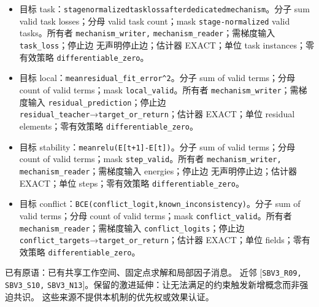 \documentclass[
  10pt,
]{article}
\begin{document}
\begin{itemize}
\item
  目标
  task：{\small\nolinkurl{stage}\hspace{0.333em}\nolinkurl{normalized}\hspace{0.333em}\nolinkurl{task}\hspace{0.333em}\nolinkurl{loss}\hspace{0.333em}\nolinkurl{after}\hspace{0.333em}\nolinkurl{dedicated}\hspace{0.333em}\nolinkurl{mechanism}}。分子
  sum valid task losses；分母 valid task count；mask
  \nolinkurl{stage-normalized} valid tasks。所有者
  \nolinkurl{mechanism_writer,} \nolinkurl{mechanism_reader}；需梯度输入
  \nolinkurl{task_loss}；停止边 无声明停止边；估计器 EXACT；单位 task
  instances；零有效策略 \nolinkurl{differentiable_zero}。
\item
  目标
  local：{\small\nolinkurl{mean}\hspace{0.333em}\nolinkurl{residual_fit_error^2}}。分子
  sum of valid terms；分母 count of valid terms；mask
  \nolinkurl{local_valid}。所有者
  \nolinkurl{mechanism_writer}；需梯度输入
  \nolinkurl{residual_prediction}；停止边
  \nolinkurl{residual_teacher}→\nolinkurl{target_or_return}；估计器
  EXACT；单位 residual elements；零有效策略
  \nolinkurl{differentiable_zero}。
\item
  目标
  stability：{\small\nolinkurl{mean}\hspace{0.333em}\nolinkurl{relu(E[t+1]-E[t])}}。分子
  sum of valid terms；分母 count of valid terms；mask
  \nolinkurl{step_valid}。所有者 \nolinkurl{mechanism_writer,}
  \nolinkurl{mechanism_reader}；需梯度输入 energies；停止边
  无声明停止边；估计器 EXACT；单位 steps；零有效策略
  \nolinkurl{differentiable_zero}。
\item
  目标
  conflict：{\small\nolinkurl{BCE(conflict_logit,known_inconsistency)}}。分子
  sum of valid terms；分母 count of valid terms；mask
  \nolinkurl{conflict_valid}。所有者
  \nolinkurl{mechanism_reader}；需梯度输入
  \nolinkurl{conflict_logits}；停止边
  \nolinkurl{conflict_targets}→\nolinkurl{target_or_return}；估计器
  EXACT；单位 fields；零有效策略 \nolinkurl{differentiable_zero}。
\end{itemize}

已有原语：已有共享工作空间、固定点求解和局部因子消息。 近邻
{[}\nolinkurl{SBV3_R09,} \nolinkurl{SBV3_S10,}
\nolinkurl{SBV3_N13}{]}。保留的激进延伸：让无法满足的约束触发新增概念而非强迫共识。
这些来源不提供本机制的优先权或效果认证。
\end{document}
